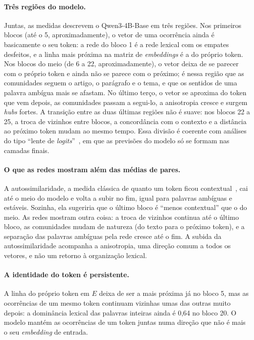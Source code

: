 \paragraph{Três regiões do modelo.} Juntas, as medidas descrevem o Qwen3-4B-Base em três
regiões. Nos primeiros blocos (até o 5, aproximadamente), o vetor de uma ocorrência ainda é
basicamente o seu token: a rede do bloco 1 é a rede lexical com os empates desfeitos, e a linha
mais próxima na matriz de \emph{embeddings} é a do próprio token. Nos blocos do meio (de 6 a
22, aproximadamente), o vetor deixa de se parecer com o próprio token e ainda não se parece com
o próximo; é nessa região que as comunidades seguem o artigo, o parágrafo e o tema, e que os
sentidos de uma palavra ambígua mais se afastam. No último terço, o vetor se aproxima do token
que vem depois, as comunidades passam a segui-lo, a anisotropia cresce e surgem \emph{hubs}
fortes. A transição entre as duas últimas regiões não é suave: nos blocos 22 a 25, a troca de
vizinhos entre blocos, a concordância com o contexto e a distância ao próximo token mudam ao
mesmo tempo. Essa divisão é coerente com análises do tipo ``lente de
\emph{logits}''~\cite{nostalgebraist2020}, em que as previsões do modelo só se formam nas
camadas finais.

\paragraph{O que as redes mostram além das médias de pares.} A autossimilaridade, a medida
clássica de quanto um token ficou contextual~\cite{ethayarajh2019}, cai até o meio do modelo e
volta a subir no fim, igual para palavras ambíguas e estáveis. Sozinha, ela sugeriria que o
último bloco é ``menos contextual'' que o do meio. As redes mostram outra coisa: a troca de
vizinhos continua até o último bloco, as comunidades mudam de natureza (do texto para o próximo
token), e a separação das palavras ambíguas pela rede cresce até o fim. A subida da
autossimilaridade acompanha a anisotropia, uma direção comum a todos os vetores, e não um
retorno à organização lexical.

\paragraph{A identidade do token é persistente.} A linha do próprio token em $E$ deixa de ser a
mais próxima já no bloco 5, mas as ocorrências de um mesmo token continuam vizinhas umas das
outras muito depois: a dominância lexical das palavras inteiras ainda é 0,64 no bloco 20. O
modelo mantém as ocorrências de um token juntas numa direção que não é mais o seu
\emph{embedding} de entrada.

